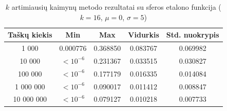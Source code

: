 \begin{table}[H]
    \centering
    \begin{tabular}{|c|c|c|c|c|}
        \hline
        \textbf{Taškų kiekis} & \textbf{Min} & \textbf{Max} & \textbf{Vidurkis} & \textbf{Std. nuokrypis} \\ \hline
        1 000        & 0.000776 & 0.368850 & 0.083767 & 0.069982 \\ \hline
        10 000       & $<10^{-6}$ & 0.231367 & 0.033515 & 0.030827 \\ \hline
        100 000      & $<10^{-6}$ & 0.177179 & 0.016335 & 0.014084 \\ \hline
        1 000 000    & $<10^{-6}$ & 0.090017 & 0.011412 & 0.008847 \\ \hline
        10 000 000   & $<10^{-6}$ & 0.079127 & 0.010218 & 0.007733 \\ \hline
    \end{tabular}
    \caption{$k$ artimiausių kaimynų metodo rezultatai su sferos etalono funkcija ($k = 16$, $\mu = 0$, $\sigma = 5$)}
\end{table}